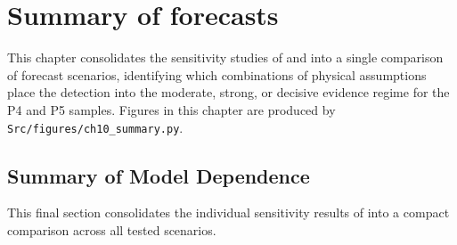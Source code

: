 \chapter{Summary of forecasts}
\label{chap:results_summary}

This chapter consolidates the sensitivity studies of
 and 
into a single comparison of forecast scenarios, identifying which
combinations of physical assumptions place the \HZIED detection
into the moderate, strong, or decisive evidence regime for the
\PLATO P4 and P5 samples.  Figures in this chapter are produced by
\texttt{Src/figures/ch10\_summary.py}.


\section{Summary of Model Dependence}
\label{sec:model_summary}

This final section consolidates the individual sensitivity results of
into a compact comparison across all tested scenarios.

%
%
%
%
